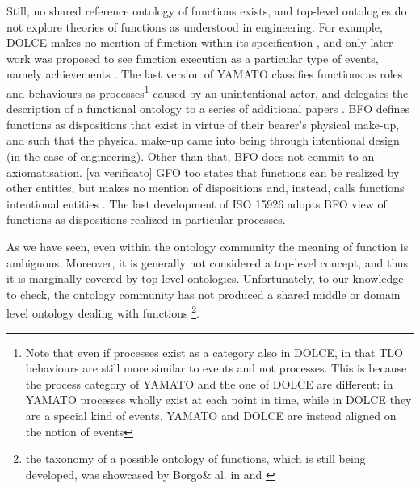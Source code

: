 \documentclass[sw]{iosart2x}
\newcommand{\DOLCE}{\textsc{DOLCE}\xspace} %
\newcommand{\YAMATO}{\textsc{YAMATO}\xspace}
\newcommand{\BFO}{\textsc{BFO}\xspace}
\newcommand{\GFO}{\textsc{GFO}\xspace}
\newcommand{\TLO}{\textnormal{TLO}\xspace}
\newcommand{\quotes}[1]{`#1'}
\newcommand{\TODO}[1]{{\color{red} #1}}
\begin{document}
Still, no shared reference ontology of functions exists, and top-level ontologies do not explore theories of functions as understood in engineering. 
For example, \DOLCE makes no mention of function within its specification \cite{masoloWonderWebDeliverableD182003}, and only later work was proposed to see function execution as a particular type of events, namely achievements \cite{borgoCapabilitiesCapacitiesFunctionalities2021}. 
The last version of \YAMATO classifies functions as roles and behaviours as processes\footnote{Note that even if processes exist as a category also in \DOLCE, in that \TLO behaviours are still more similar to events and not processes. This is because the process category of \YAMATO and the one of \DOLCE are different: in \YAMATO processes wholly exist at each point in time, while in \DOLCE they are a special kind of events. \YAMATO  and \DOLCE are instead aligned on the notion of events %
} 
caused by an unintentional actor, and delegates the description of a functional ontology to a series of additional papers \cite{kitamuraOntologicalModelDevice2006, kitamuraCharacterizingFunctionsBased2013, mizoguchiFunctionalOntologyArtifacts2009}. 
\BFO defines functions as dispositions%
that exist in virtue of their bearer's physical make-up, and such that the physical make-up came into being through intentional design (in the case of engineering). Other than that, \BFO does not commit to an axiomatisation.\TODO{[va verificato]}
\GFO too states that functions can be realized by other entities, but makes no mention of dispositions and, instead, calls functions intentional entities \cite{herreGeneralFormalOntology2006}.
The last development of ISO 15926 \cite{kluwerISO159261420202020} adopts \BFO view of functions as dispositions realized in particular processes.

As we have seen, even within the ontology community the meaning of function is ambiguous. 
Moreover, it is generally not considered a top-level concept, and thus it is marginally covered by top-level ontologies. 
Unfortunately, to our knowledge \TODO{to check}, the ontology community has not produced a shared middle or domain level ontology dealing with functions \footnote{the taxonomy of a possible ontology of functions, which is still being developed, was showcased by Borgo\& al. in \cite{borgoCapabilitiesCapacitiesFunctionalities2021} and \cite{borgoKnowledgebasedAdaptiveAgents2019}}. 
\end{document}

